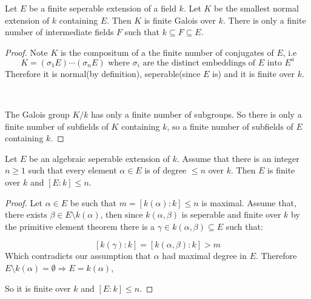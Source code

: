 \begin{corollary}
    Let $E$ be a finite seperable extension of a field $k$. Let $K$ be the smallest normal extension of $k$ containing $E$. Then $K$ is finite Galois over $k$. There is only a finite number of intermediate fields $F$ such that $k\subseteq F\subseteq E$.

    \begin{proof}
        Note $K$ is the compositum of a the finite number of conjugates of $E$, i.e \[
            K = (\sigma_1 E)\cdots (\sigma_n E) \text{ where }\sigma_i\text{ are the distinct embeddings of }E\text{ into }E^a    
        \] Therefore it is normal(by definition), seperable(since $E$ is) and it is finite over $k$.

        \

        The Galois group $K/k$ has only a finite number of subgroups. So there is only a finite number of subfields of $K$ containing $k$, so a finite number of subfields of $E$ containing $k$.
    \end{proof}
\end{corollary}

\begin{lemma}\label{1.7}
    Let $E$ be an algebraic seperable extension of $k$. Assume that there is an integer $n\geq 1$ such that every element $\alpha\in E$ is of degree $\leq n$ over $k$. Then $E$ is finite over $k$ and $[E\colon k]\leq n$.

    \begin{proof}
        Let $\alpha\in E$ be such that $m = [k(\alpha)\colon k]\leq n$ is maximal. Assume that, there exists $\beta\in E\setminus k(\alpha)$, then since $k(\alpha,\beta)$ is seperable and finite over $k$ by the primitive element theorem there is a $\gamma\in k(\alpha,\beta)\subseteq E$ such that:

        \[ [k(\gamma)\colon k] = [k(\alpha,\beta)\colon k] > m \] Which contradicts our assumption that $\alpha$ had maximal degree in $E$. Therefore $E\setminus k(\alpha) = \emptyset\Rightarrow E = k(\alpha)$,

        So it is finite over $k$ and $[E\colon k]\leq n$.
    \end{proof}
\end{lemma}

